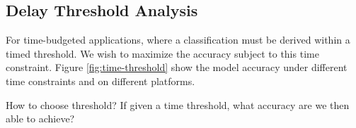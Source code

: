\subsection{Delay Threshold Analysis}

For time-budgeted applications, where a classification must be derived within a timed threshold. We wish to maximize the accuracy subject to this time constraint. Figure \ref{fig:time-threshold} show the model accuracy under different time constraints and on different platforms.

How to choose threshold?
If given a time threshold, what accuracy are we then able to achieve? 

\begin{figure}
	\captionsetup[subfigure]{justification=centering}
	\centering
	\hfill
	\hfill

\end{figure}
